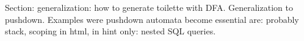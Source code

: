 Section: generalization:
  how to generate toilette with DFA\@.%
  Generalization to pushdown.
  Examples were pushdown automata become essential are: probably stack, scoping in html,
    in hint only: nested SQL queries.
